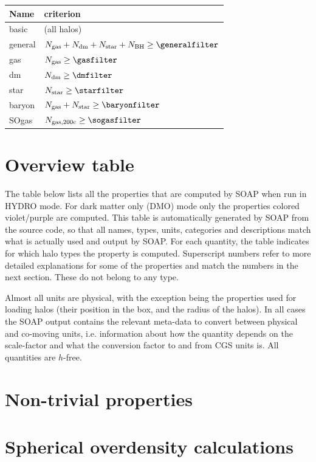 \documentclass{article}
\begin{document}
\begin{longtable}{ll}
Name & criterion \\
\hline{}basic & (all halos) \\
general & $N_{\rm{}gas}+N_{\rm{}dm}+N_{\rm{}star}+N_{\rm{}BH} \geq{} \generalfilter$ \\
gas & $N_{\rm{}gas} \geq{} \gasfilter$ \\
dm & $N_{\rm{}dm} \geq{} \dmfilter$ \\
star & $N_{\rm{}star} \geq{} \starfilter$ \\
baryon & $N_{\rm{}gas}+N_{\rm{}star} \geq{} \baryonfilter$ \\
SOgas & $N_{\rm{}gas, 200c} \geq{} \sogasfilter$ \\
\end{longtable}

\section{Overview table}

The table below lists all the properties that are computed by SOAP when run in HYDRO mode. 
For dark matter only (DMO) mode only the properties colored violet/purple are computed.
This table is automatically generated by 
SOAP from the source code, so that all names, types, units, categories and descriptions match what is actually 
used and output by SOAP. For each quantity, the table indicates for which halo types the property is computed. 
Superscript numbers refer to more detailed explanations for some of the properties and match the numbers in 
the next section. These do not belong to 
any type. 

Almost all units are physical, with the exception being the properties used for loading halos (their position
in the box, and the radius of the halos). In all cases the SOAP output contains the relevant meta-data to 
convert between physical and co-moving units, i.e. information about how the quantity depends on the 
scale-factor and what the conversion factor to and from CGS units is. All quantities are $h$-free.



\section{Non-trivial properties}



\section{Spherical overdensity calculations}
\end{document}

